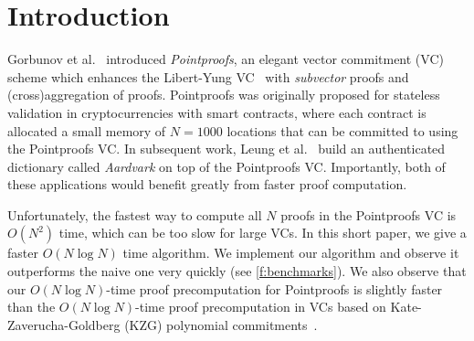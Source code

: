 \section{Introduction}

Gorbunov et al.~\cite{GRWZ20} introduced \textit{Pointproofs}, an elegant vector commitment (VC) scheme which enhances the Libert-Yung VC~\cite{LY10} with \textit{subvector} proofs and (cross)aggregation of proofs.
Pointproofs was originally proposed for stateless validation in cryptocurrencies with smart contracts, where each contract is allocated a small memory of $N=1000$ locations that can be committed to using the Pointproofs VC.
In subsequent work, Leung et al.~\cite{LGG+20} build an authenticated dictionary called \textit{Aardvark} on top of the Pointproofs VC.
Importantly, both of these applications would benefit greatly from faster proof computation.

Unfortunately, the fastest way to compute all $N$ proofs in the Pointproofs VC is $O(N^2)$ time, which can be too slow for large VCs.
In this short paper, we give a faster $O(N\log{N})$ time algorithm.
We implement our algorithm and observe it outperforms the naive one very quickly (see \cref{f:benchmarks}).
We also observe that our $O(N\log{N})$-time proof precomputation for Pointproofs is slightly faster than the $O(N\log{N})$-time proof precomputation in VCs based on Kate-Zaverucha-Goldberg (KZG) polynomial commitments~\cite{KZG10,FK20,TAB+20}.